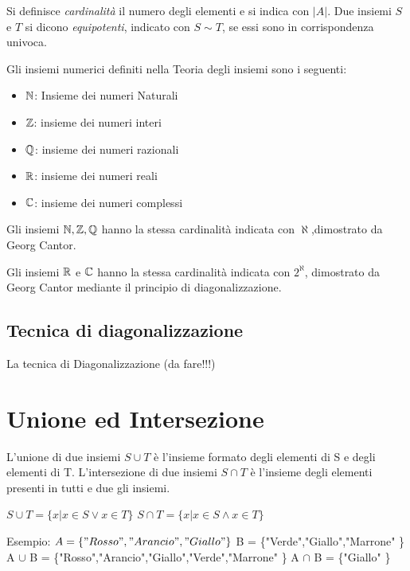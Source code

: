 Si definisce \textit{cardinalità} il numero degli elementi e si indica con $|A|$.\newline
Due insiemi $S$ e $T$ si dicono \textit{equipotenti}, indicato con $S \sim T$, se
essi sono in corrispondenza univoca.

Gli insiemi numerici definiti nella Teoria degli insiemi sono i seguenti: \newline
\begin{itemize}
  \item $\mathbb{N}$: Insieme dei numeri Naturali
  \item $\mathbb{Z}$: insieme dei numeri interi
  \item $\mathbb{Q}$: insieme dei numeri razionali
  \item $\mathbb{R}$: insieme dei numeri reali
  \item $\mathbb{C}$: insieme dei numeri complessi
\end{itemize}

Gli insiemi $\mathbb{N}, \mathbb{Z}, \mathbb{Q}$ hanno la stessa cardinalità indicata con $\aleph$,dimostrato da Georg Cantor.

Gli insiemi $\mathbb{R}$ e $\mathbb{C}$ hanno la stessa cardinalità indicata con $ 2 ^ \aleph$,
dimostrato da Georg Cantor mediante il principio di diagonalizzazione.

\subsection{Tecnica di diagonalizzazione}
La tecnica di Diagonalizzazione (da fare!!!)

\section{Unione ed Intersezione}
L'unione di due insiemi $S \cup T$ è l'insieme formato degli elementi di S e degli
elementi di T.\newline
L'intersezione di due insiemi $S \cap T$ è l'insieme degli elementi presenti in
tutti e due gli insiemi.

$S \cup T = \{x | x \in S \lor x \in T \} $ \newline
$S \cap T = \{x | x \in S \land x \in T \} $

Esempio:\newline
$A = \{"Rosso","Arancio","Giallo" \}$ \newline
B = \{"Verde","Giallo","Marrone" \} \newline
A $\cup$ B = \{"Rosso","Arancio","Giallo","Verde","Marrone" \}\newline
A $\cap$ B = \{"Giallo" \}

